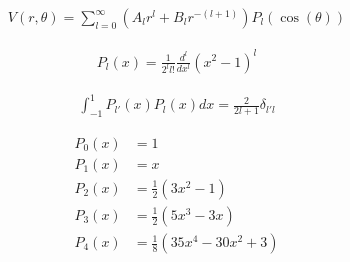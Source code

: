 \begin{align*}
	V(r, \theta) = \sum_{l=0}^{\infty} (A_l r^l + B_l r^{-(l+1)}) P_l(\cos(\theta))
\end{align*}

\begin{align*}
	P_l(x) = \frac{1}{2^l l!} \frac{d^l}{dx^l} (x^2-1)^l
\end{align*}

\begin{align*}
	\int_{-1}^{1} P_{l'}(x)P_l(x) dx = \frac{2}{2l+1} \delta_{l' l}
\end{align*}

\begin{align*}
	P_0(x) &= 1 \\
	P_1(x) &= x \\
	P_2(x) &= \tfrac{1}{2}(3x^2-1) \\
	P_3(x) &= \tfrac{1}{2}(5x^3-3x) \\
	P_4(x) &= \tfrac{1}{8}(35x^4-30x^2+3) \\
\end{align*}
